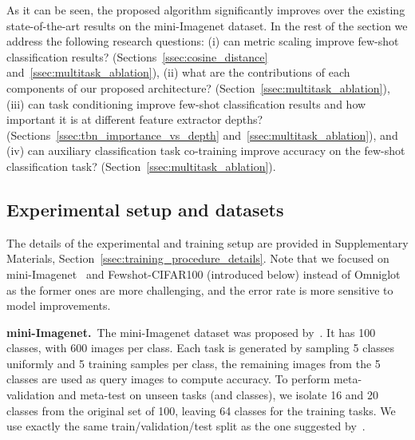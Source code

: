 \documentclass{article}
\begin{document}
As it can be seen, the proposed algorithm significantly improves over the existing state-of-the-art results on the mini-Imagenet dataset. In the rest of the section we address the following research questions: (i) can metric scaling improve few-shot classification results? (Sections~\ref{ssec:cosine_distance} and~\ref{ssec:multitask_ablation}), (ii) what are the contributions of each components of our proposed architecture? (Section~\ref{ssec:multitask_ablation}), (iii) can task conditioning improve few-shot classification results and how important it is at different feature extractor depths? (Sections~\ref{ssec:tbn_importance_vs_depth} and~\ref{ssec:multitask_ablation}), and (iv) can auxiliary classification task co-training improve accuracy on the few-shot classification task? (Section~\ref{ssec:multitask_ablation}).

\subsection{Experimental setup and datasets}\label{ssec:datasets}

The details of the experimental and training setup are provided in Supplementary Materials, Section~\ref{ssec:training_procedure_details}. Note that we focused on mini-Imagenet~\cite{vinyals2016matching} and Fewshot-CIFAR100 (introduced below) instead of Omniglot \cite{lake2015human,vinyals2016matching, snell2017prototypical} as the former ones are more challenging, and the error rate is more sensitive to model improvements.

\textbf{mini-Imagenet.}~The mini-Imagenet dataset was proposed by~\citet{vinyals2016matching}. It has 100 classes, with 600  images per class. Each task is generated by sampling 5 classes uniformly and 5 training samples per class, the remaining images from the 5 classes are used as query images to compute accuracy. To perform meta-validation and meta-test on unseen tasks (and classes), we isolate 16 and 20 classes from the original set of 100, leaving 64 classes for the training tasks. We use exactly the same train/validation/test split as the one suggested by~\citet{ravi2016optimization}. 
\end{document}
